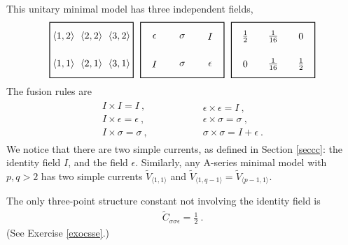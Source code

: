 \documentclass[12pt, a4paper, notitlepage, twoside]{report}
\numberwithin{equation}{section}
\theoremstyle{break}
\begin{document}
This unitary minimal model has three independent fields, 
\begin{align}
 \begin{tikzpicture}[scale = .5, baseline=(current  bounding  box.center)]
  \draw[thick] (-1,-1) -- (-1, 3) -- (5, 3) -- (5, -1) -- cycle;
  \foreach \x in {1, ..., 3}{
  \foreach \y in {1, 2}{
  \node at ({2*(\x-1)}, {2*(\y-1)}) {$\langle \x,\y\rangle $};
  }}
 \end{tikzpicture}
 \ \ 
 \begin{tikzpicture}[scale = .5, baseline=(current  bounding  box.center)]
  \draw[thick] (-1,-1) -- (-1, 3) -- (5, 3) -- (5, -1) -- cycle;
  \node at (0, 0) {$I$};
  \node at (2, 0) {$\sigma$};
  \node at (4, 0) {$\epsilon$};
  \node at (0, 2) {$\epsilon$};
  \node at (2, 2) {$\sigma$};
  \node at (4, 2) {$I$};
 \end{tikzpicture}
 \ \ 
 \begin{tikzpicture}[scale = .5, baseline=(current  bounding  box.center)]
  \draw[thick] (-1,-1) -- (-1, 3) -- (5, 3) -- (5, -1) -- cycle;
  \node at (0, 0) {$0$};
  \node at (2, 0) {$\frac{1}{16}$};
  \node at (4, 0) {$\frac12$};
  \node at (0, 2) {$\frac12$};
  \node at (2, 2) {$\frac{1}{16}$};
  \node at (4, 2) {$0$};
 \end{tikzpicture}
\end{align}
The fusion rules are 
\begin{align}
\begin{array}{l}
 I\times I = I \ ,
\\ I\times \epsilon = \epsilon\ ,
\\ I\times \sigma = \sigma\ ,
\end{array}
\hspace{2cm}
\begin{array}{l}
 \epsilon\times \epsilon = I\ ,
\\ \epsilon\times \sigma = \sigma\ ,
\\ \sigma \times \sigma = I + \epsilon\ .
\end{array}
\end{align}
We notice that there are two simple currents, as defined in Section \ref{seccc}: the identity field $I$, and the field $\epsilon$.
Similarly, any A-series minimal model with $p,q>2$ has two simple currents $\tilde{V}_{\langle 1,1 \rangle}$ and $\tilde{V}_{\langle 1,q-1 \rangle}=\tilde{V}_{\langle p-1,1 \rangle}$. 

The only three-point structure constant not involving the identity field is 
\begin{align}
 \tilde{C}_{\sigma\sigma\epsilon} =\frac12\ .
\label{csse}
\end{align}
(See Exercise \ref{exocsse}.)
\end{document}
